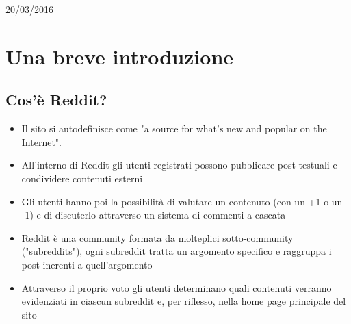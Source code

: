 \documentclass[12pt]{article}
\begin{document}
\begin{titlepage}


{\large 20/03/2016}\\[3cm] %


 

\vfill %

\end{titlepage}

\newpage
\renewcommand{\contentsname}{Indice}
\tableofcontents

\newpage
{}

\section{Una breve introduzione}
\subsection{Cos'\`e Reddit?}
\begin{itemize}
	\item Il sito si autodefinisce come "a source for what's new and popular on the Internet".
	\item All'interno di Reddit gli utenti registrati possono pubblicare post testuali e condividere contenuti esterni
	\item Gli utenti hanno poi la possibilit\`a di valutare un contenuto (con un +1 o un -1) e di discuterlo attraverso un sistema di commenti a cascata
	\item Reddit \`e una community formata da molteplici sotto-community ("subreddits"), ogni subreddit tratta un argomento specifico e raggruppa i post inerenti a quell'argomento
	\item Attraverso il proprio voto gli utenti determinano quali contenuti verranno evidenziati in ciascun subreddit e, per riflesso, nella home page principale del sito
\end{itemize}
\end{document}

